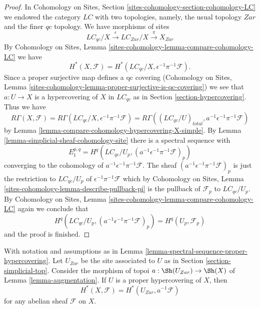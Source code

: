 \begin{proof}
In Cohomology on Sites, Section \ref{sites-cohomology-section-cohomology-LC}
we endowed the category $\textit{LC}$ with two topologies, namely, the
usual topology $Zar$ and the finer $qc$ topology.
We have morphisms of sites
$$
\textit{LC}_{qc}/X \xrightarrow{\epsilon}
\textit{LC}_{Zar}/X \xrightarrow{\pi}
X_{Zar}
$$
By Cohomology on Sites, Lemma
\ref{sites-cohomology-lemma-compare-cohomology-LC}
we have
$$
H^*(X, \mathcal{F}) =
H^*(\textit{LC}_{qc}/X, \epsilon^{-1}\pi^{-1}\mathcal{F}).
$$
Since a proper surjective map defines a qc covering
(Cohomology on Sites, Lemma
\ref{sites-cohomology-lemma-proper-surjective-is-qc-covering})
we see that $a : U \to X$ is a hypercovering of $X$ in $\textit{LC}_{qc}$
as in Section \ref{section-hypercovering}. Thus we have
$$
R\Gamma(X, \mathcal{F}) =
R\Gamma(\textit{LC}_{qc}/X, \epsilon^{-1}\pi^{-1}\mathcal{F}) =
R\Gamma((\textit{LC}_{qc}/U)_{total}, a^{-1}\epsilon^{-1}\pi^{-1}\mathcal{F})
$$
by Lemma \ref{lemma-compare-cohomology-hypercovering-X-simple}.
By Lemma \ref{lemma-simplicial-sheaf-cohomology-site}
there is a spectral sequence with
$$
E_1^{p, q} =
H^q(\textit{LC}_{qc}/U_p, (a^{-1}\epsilon^{-1}\pi^{-1}\mathcal{F})_p)
$$
converging to the cohomology of $a^{-1}\epsilon^{-1}\pi^{-1}\mathcal{F}$.
The sheaf $(a^{-1}\epsilon^{-1}\pi^{-1}\mathcal{F})_p$
is just the restriction to $\textit{LC}_{qc}/U_p$ of
$\epsilon^{-1}\pi^{-1}\mathcal{F}$ which by
Cohomology on Sites, Lemma \ref{sites-cohomology-lemma-describe-pullback-pi}
is the pullback of $\mathcal{F}_p$ to $\textit{LC}_{qc}/U_p$.
By Cohomology on Sites, Lemma
\ref{sites-cohomology-lemma-compare-cohomology-LC}
again we conclude that
$$
H^q(\textit{LC}_{qc}/U_p, (a^{-1}\epsilon^{-1}\pi^{-1}\mathcal{F})_p)
= H^q(U_p, \mathcal{F}_p)
$$
and the proof is finished.
\end{proof}

\begin{lemma}
\label{lemma-compute-via-proper-hypercovering}
With notation and assumptions as in
Lemma \ref{lemma-spectral-sequence-proper-hypercovering}.
Let $U_{Zar}$ be the site associated to $U$ as in
Section \ref{section-simplicial-top}.
Consider the morphism of topoi $a : \Sh(U_{Zar}) \to \Sh(X)$
of Lemma \ref{lemma-augmentation}.
If $U$ is a proper hypercovering of $X$, then
$$
H^*(X, \mathcal{F}) = H^*(U_{Zar}, a^{-1}\mathcal{F})
$$
for any abelian sheaf $\mathcal{F}$ on $X$.
\end{lemma}

